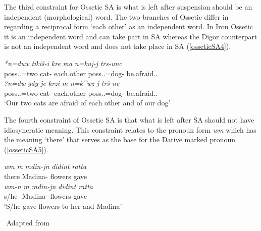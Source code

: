 The third constraint for Ossetic SA is what is left after suspension should be an independent (morphological) word. The two branches of Ossetic differ in regarding a reciprocal form `each other' as an independent word. In Iron Ossetic it is an independent word and can take part in SA whereas the Digor counterpart is not an independent word and does not take place in SA (\ref{osseticSA4}).

\begin{exe}
    \ex \label{osseticSA4}
    \begin{xlist}
        \ex 
        \gll 
        \textit{*n\textturna=duw\textturna} \textit{tiki\v{s}-i} \textit{k\textturna r\textturna\textdyoghlig e} \textit{\textturna ma} \textit{n\textturna=kuj-\textturna j} \textit{t\textturna rs-unc\textturna} \\ poss.{\First}.{\Pl}=two cat-{\Obl} each.other {\And} poss.{\First}.{\Pl}=dog-{\Abl} be.afraid.{\Prs}.{\Third}{\Pl} \\
    
        \ex 
        \gll 
        \textit{?n\textturna=d\textschwa w\textturna} \textit{g\textturna dy-je} \textit{k\textturna r\textturna zi} \textit{\textturna m\textturna} \textit{n\textturna=k^w\textschwa z-\textturna j} \textit{t\textturna r\v{s}-\textschwa nc} \\ poss.{\First}.{\Pl}=two cat-{\Obl} each.other {\And} poss.{\First}.{\Pl}=dog-{\Abl} be.afraid.{\Prs}.{\Third}{\Pl} \\
        \glt `Our two cats are afraid of each other and of our dog'
    \end{xlist}
\end{exe}

The fourth constraint of Ossetic SA is that what is left after SA should not have idiosyncratic meaning. This constraint relates to the {\Third}{\Sg} pronoun form \textit{w\textschwa m} which has the meaning `there' that serves as the base for the Dative marked {\Third}{\Sg} pronoun (\ref{osseticSA5}).

\begin{exe}
    \ex \label{osseticSA5}
    \begin{xlist}
        \ex 
    \gll 
    \textit{w\textschwa m} \textit{\textturna m\textturna} \textit{m\textturna din\textturna-j\textturna n} \textit{didin\textdyoghlig\textschwa t\textturna} \textit{ratta} \\ there {\And} Madina-{\Dat} flowers gave \\
    
    \ex 
    \gll 
    \textit{w\textschwa m-\textturna n} \textit{\textturna m\textturna} \textit{m\textturna din\textturna-j\textturna n} \textit{didin\textdyoghlig\textschwa t\textturna} \textit{ratta} \\ s/he-{\Dat} {\And} Madina-{\Dat} flowers gave \\
    \glt `S/he gave flowers to her and Madina'
    \end{xlist}
    ${}$ \hfill Adapted from \cite{erschler2012suspended}
\end{exe}

